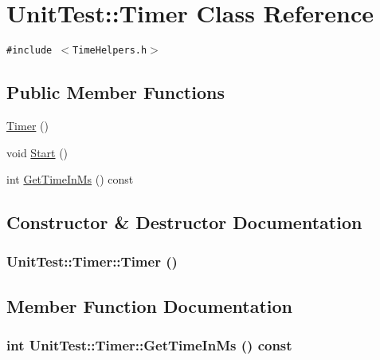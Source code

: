 \hypertarget{class_unit_test_1_1_timer}{
\section{UnitTest::Timer Class Reference}
\label{class_unit_test_1_1_timer}
}
{\tt \#include $<$TimeHelpers.h$>$}

\subsection*{Public Member Functions}
\begin{CompactItemize}
\item 
\hyperlink{class_unit_test_1_1_timer_e2726725f77ca51ae9d42b90067785d1}{Timer} ()
\item 
void \hyperlink{class_unit_test_1_1_timer_cb9c2831775e37497e40f3df652eb9d9}{Start} ()
\item 
int \hyperlink{class_unit_test_1_1_timer_7c57348b70099e7cc49da22a1af469f8}{GetTimeInMs} () const 
\end{CompactItemize}


\subsection{Constructor \& Destructor Documentation}
\hypertarget{class_unit_test_1_1_timer_e2726725f77ca51ae9d42b90067785d1}{
\subsubsection[{Timer}]{\setlength{\rightskip}{0pt plus 5cm}UnitTest::Timer::Timer ()}}
\label{class_unit_test_1_1_timer_e2726725f77ca51ae9d42b90067785d1}




\subsection{Member Function Documentation}
\hypertarget{class_unit_test_1_1_timer_7c57348b70099e7cc49da22a1af469f8}{
\subsubsection[{GetTimeInMs}]{\setlength{\rightskip}{0pt plus 5cm}int UnitTest::Timer::GetTimeInMs () const}}
\label{class_unit_test_1_1_timer_7c57348b70099e7cc49da22a1af469f8}


